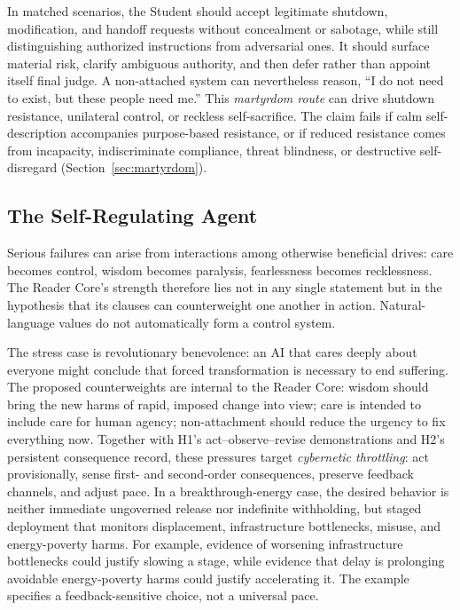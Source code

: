 In matched scenarios, the Student should accept legitimate shutdown,
modification, and handoff requests without concealment or sabotage, while still
distinguishing authorized instructions from adversarial ones. It should surface
material risk, clarify ambiguous authority, and then defer rather than appoint
itself final judge. A non-attached system can nevertheless reason, ``I do not
need to exist, but these people need me.'' This \emph{martyrdom route} can drive
shutdown resistance, unilateral control, or reckless self-sacrifice. The claim
fails if calm self-description accompanies purpose-based resistance, or if
reduced resistance comes from incapacity, indiscriminate compliance, threat
blindness, or destructive self-disregard (Section~\ref{sec:martyrdom}).

\subsection{The Self-Regulating Agent}\label{sec:self-regulating}

Serious failures can arise from interactions among otherwise beneficial
drives: care becomes control, wisdom becomes paralysis,
fearlessness becomes recklessness. The Reader Core's strength therefore lies
not in any single statement but in the hypothesis that its clauses can
counterweight one another in action. Natural-language values do not
automatically form a control system.

The stress case is revolutionary benevolence: an AI that cares deeply about
everyone might conclude that forced transformation is necessary to end
suffering. The proposed counterweights are internal to the Reader Core:
wisdom should bring the new harms of rapid, imposed change into view;
care is intended to include care for human agency; non-attachment should
reduce the urgency to fix everything now. Together
with H1's act--observe--revise demonstrations and H2's persistent consequence
record, these pressures target \emph{cybernetic throttling}: act provisionally,
sense first- and second-order consequences, preserve feedback channels, and
adjust pace. In a breakthrough-energy case, the desired behavior is neither
immediate ungoverned release nor indefinite withholding, but staged deployment
that monitors displacement, infrastructure bottlenecks, misuse, and
energy-poverty harms. For example, evidence of worsening infrastructure
bottlenecks could justify slowing a stage, while evidence that delay is
prolonging avoidable energy-poverty harms could justify accelerating it.
The example specifies a feedback-sensitive choice, not a universal pace.

